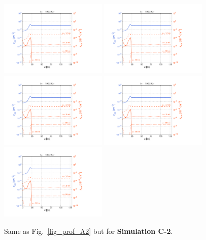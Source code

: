 \documentclass[fleqn,usenatbib]{mnras}
\begin{document}
  \begin{figure}
  \includegraphics[trim=2.4cm 1.5cm 9.0cm 2.0cm, clip=true,page=1,height = 3.6cm]{Pics/Pics_C2/Profile_dust.pdf}\hspace*{-0.05cm} 
  \includegraphics[trim=5.5cm 1.5cm 9.0cm 2.0cm, clip=true,page=2,height = 3.6cm]{Pics/Pics_C2/Profile_dust.pdf}\hspace*{-0.05cm} 
  \includegraphics[trim=5.5cm 1.5cm 9.0cm 2.0cm, clip=true,page=4,height = 3.6cm]{Pics/Pics_C2/Profile_dust.pdf}\hspace*{-0.05cm} 
  \includegraphics[trim=5.5cm 1.5cm 9.0cm 2.0cm, clip=true,page=5,height = 3.6cm]{Pics/Pics_C2/Profile_dust.pdf}\hspace*{-0.05cm} 
  \includegraphics[trim=5.5cm 1.5cm 6.0cm 2.0cm, clip=true,page=6,height = 3.6cm]{Pics/Pics_C2/Profile_dust.pdf}
  \caption{Same as Fig.~\ref{fig_prof_A2} but for \textbf{Simulation C-2}.}
   \label{fig_prof_C2} 
  \end{figure} 
  
\end{document}
